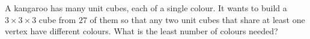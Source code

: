 A kangaroo has many unit cubes, each of a single colour. It wants to build a $3\times3\times3$ cube from $27$ of them so that any two unit cubes that share at least one vertex have different colours. What is the least number of colours needed?
